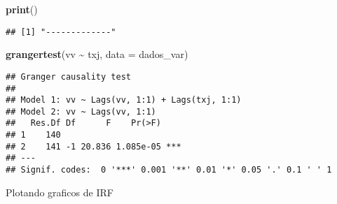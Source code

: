 \documentclass[
]{article}
\newenvironment{Shaded}{\begin{snugshade}}{\end{snugshade}}
\newcommand{\AttributeTok}[1]{\textcolor[rgb]{0.13,0.29,0.53}{#1}}
\newcommand{\FunctionTok}[1]{\textcolor[rgb]{0.13,0.29,0.53}{\textbf{#1}}}
\newcommand{\NormalTok}[1]{#1}
\newcommand{\SpecialCharTok}[1]{\textcolor[rgb]{0.81,0.36,0.00}{\textbf{#1}}}
\newcommand{\StringTok}[1]{\textcolor[rgb]{0.31,0.60,0.02}{#1}}
\begin{document}
\begin{Shaded}
\begin{Highlighting}[]
\FunctionTok{print}\NormalTok{(}\StringTok{\textquotesingle{}{-}{-}{-}{-}{-}{-}{-}{-}{-}{-}{-}{-}{-}\textquotesingle{}}\NormalTok{)}
\end{Highlighting}
\end{Shaded}

\begin{verbatim}
## [1] "-------------"
\end{verbatim}

\begin{Shaded}
\begin{Highlighting}[]
\FunctionTok{grangertest}\NormalTok{(vv }\SpecialCharTok{\textasciitilde{}}\NormalTok{ txj, }\AttributeTok{data =}\NormalTok{ dados\_var)}
\end{Highlighting}
\end{Shaded}

\begin{verbatim}
## Granger causality test
## 
## Model 1: vv ~ Lags(vv, 1:1) + Lags(txj, 1:1)
## Model 2: vv ~ Lags(vv, 1:1)
##   Res.Df Df      F    Pr(>F)    
## 1    140                        
## 2    141 -1 20.836 1.085e-05 ***
## ---
## Signif. codes:  0 '***' 0.001 '**' 0.01 '*' 0.05 '.' 0.1 ' ' 1
\end{verbatim}

Plotando graficos de IRF
\end{document}
